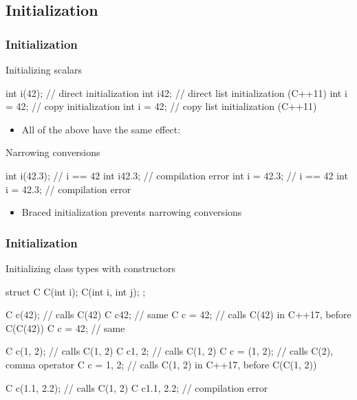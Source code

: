 \subsection[Init]{Initialization}

\begin{frame}[fragile]
  \frametitle{Initialization}
  \begin{block}{Initializing scalars}
    \begin{cppcode}
      int i(42);    // direct initialization
      int i{42};    // direct list initialization (C++11)
      int i = 42;   // copy initialization
      int i = {42}; // copy list initialization (C++11)
    \end{cppcode}
    \begin{itemize}
      \item All of the above have the same effect: 
    \end{itemize}
  \end{block}
  \begin{block}{Narrowing conversions}
    \begin{cppcode}
      int i(42.3);    // i == 42
      int i{42.3};    // compilation error
      int i = 42.3;   // i == 42
      int i = {42.3}; // compilation error
    \end{cppcode}
    \begin{itemize}
      \item Braced initialization prevents narrowing conversions
    \end{itemize}
  \end{block}
\end{frame}

\begin{frame}[fragile,shrink=10]
  \frametitle{Initialization}
  \begin{block}{Initializing class types with constructors}
    \begin{cppcode}
      struct C {
        C(int i);
        C(int i, int j);
      };

      C c(42);    // calls C(42)
      C c{42};    // same
      C c = 42;   // calls C(42) in C++17, before C(C(42))
      C c = {42}; // same

      C c(1, 2);    // calls C(1, 2)
      C c{1, 2};    // calls C(1, 2)
      C c = (1, 2); // calls C(2), comma operator
      C c = {1, 2}; // calls C(1, 2) in C++17, before C(C(1, 2))

      C c(1.1, 2.2); // calls C(1, 2)
      C c{1.1, 2.2}; // compilation error
    \end{cppcode}
  \end{block}
\end{frame}

